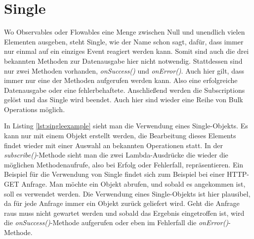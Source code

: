\section{Single}
Wo Observables oder Flowables eine Menge zwischen Null und unendlich vielen Elementen ausgeben, steht Single, wie der Name schon sagt, dafür, dass immer nur einmal auf ein einziges Event reagiert werden kann. Somit sind auch die drei bekannten Methoden zur Datenausgabe hier nicht notwendig. Stattdessen sind nur zwei Methoden vorhanden, \textit{onSuccess()} und \textit{onError()}. Auch hier gilt, dass immer nur eine der Methoden aufgerufen werden kann. Also eine erfolgreiche Datenausgabe oder eine fehlerbehaftete. Anschließend werden die Subscriptions gelöst und das Single wird beendet. Auch hier sind wieder eine Reihe von Bulk Operations möglich. 

In Listing \ref{lst:singleexample} sieht man die Verwendung eines Single-Objekts. Es kann nur mit einem Objekt erstellt werden, die Bearbeitung dieses Elements findet wieder mit einer Auswahl an bekannten Operationen statt. In der \textit{subscribe()}-Methode sieht man die zwei Lambda-Ausdrücke die wieder die möglichen Methodenaufrufe, also bei Erfolg oder Fehlerfall, repräsentieren. Ein Beispiel für die Verwendung von Single findet sich zum Beispiel bei einer HTTP-GET Anfrage. Man möchte ein Objekt abrufen, und sobald es angekommen ist, soll es verwendet werden. Die Verwendung eines Single-Objekts ist hier plausibel, da für jede Anfrage immer ein Objekt zurück geliefert wird. Geht die Anfrage raus muss nicht gewartet werden und sobald das Ergebnis eingetroffen ist, wird die \textit{onSuccess()}-Methode aufgerufen oder eben im Fehlerfall die \textit{onError()}-Methode. 
